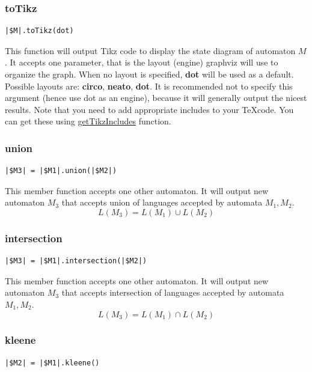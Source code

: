 \documentclass{ctuthesis}
\begin{document}
\subsubsection{toTikz}
\begin{lstlisting}[language = JASL_snippet]
	|$M|.toTikz(dot)
\end{lstlisting}

This function will output Tikz code to display the state diagram of automaton $M$. It accepts one parameter, that is the layout (engine) graphviz will use to organize the graph. When no layout is specified, \textbf{dot} will be used as a default. Possible layouts are: \textbf{circo}, \textbf{neato}, \textbf{dot}. It is recommended not to specify this argument (hence use dot as an engine), because it will generally output the nicest results. Note that you need to add appropriate includes to your \TeX code. You can get these using \hyperref[subsec:getTikzIncludes]{getTikzIncludes} function.

\subsubsection{union}
\begin{lstlisting}[language = JASL_snippet]
	|$M3| = |$M1|.union(|$M2|)
\end{lstlisting}

This member function accepts one other automaton. It will output new automaton $M_3$ that accepts union of languages accepted by automata $M_1, M_2$. 
\begin{equation*}
L(M_3) = L(M_1) \cup L(M_2)
\end{equation*}

\subsubsection{intersection}
\begin{lstlisting}[language = JASL_snippet]
	|$M3| = |$M1|.intersection(|$M2|)
\end{lstlisting}

This member function accepts one other automaton. It will output new automaton $M_3$ that accepts intersection of languages accepted by automata $M_1, M_2$.
\begin{equation*}
	L(M_3) = L(M_1) \cap L(M_2)
\end{equation*}

\subsubsection{kleene}
\begin{lstlisting}[language = JASL_snippet]
	|$M2| = |$M1|.kleene()
\end{lstlisting}
\end{document}
